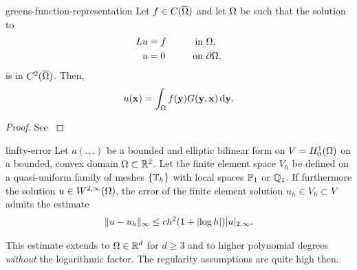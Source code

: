 \begin{Theorem}{greens-function-representation}
  Let $f\in C(\overline\domain)$ and let $\domain$ be such that the
  solution to
  \begin{gather}
    \begin{aligned}
      Lu &= f &\qquad\text{in }&\domain,\\
      u &= 0 &\text{on }&\d\domain,
    \end{aligned}
  \end{gather}
  is in $C^2(\overline\domain)$. Then,
  \begin{gather}
    u(\vx) = \int_\domain f(\vy)G(\vy,\vx)\dvy.
  \end{gather}
\end{Theorem}

\begin{proof}
  See \cite[Section 2.2]{Evans98}
\end{proof}

\begin{Theorem}{linfty-error}
  Let $a(.,.)$ be a bounded and elliptic bilinear form on
  $V = H^1_0(\domain)$ on a bounded, convex domain $\domain\subset \R^2$. Let the
  finite element space $V_h$ be defined on a quasi-uniform family of
  meshes $\{\mesh_h\}$ with local spaces $\P_1$ or $\Q_1$. If
  furthermore the solution $u\in W^{2,\infty}(\domain)$, the error of
  the finite element solution $u_h\in V_h \subset V$ admits the
  estimate
  \begin{gather}
    \norm{u-u_h}_{\infty} \le c h^{2} (1+\abs{\log h}) \snorm{u}_{2,\infty}.
  \end{gather}
\end{Theorem}

\begin{remark}
  This estimate extends to $\domain\in\R^d$ for $d\ge 3$ and to higher
  polynomial degrees \emph{without} the logarithmic factor. The
  regularity assumptions are quite high then.
\end{remark}

